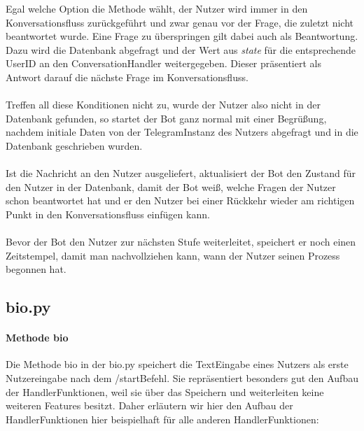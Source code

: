             Egal welche Option die Methode wählt, der Nutzer wird immer in den Konversationsfluss zurückgeführt und zwar genau vor der Frage, die zuletzt nicht beantwortet wurde. Eine Frage zu überspringen gilt dabei auch als Beantwortung. Dazu wird die Datenbank abgefragt und der Wert aus \emph{state} für die entsprechende User\-ID an den ConversationHandler weitergegeben. Dieser präsentiert als Antwort darauf die nächste Frage im Konversationsfluss. \\
            \\
            Treffen all diese Konditionen nicht zu, wurde der Nutzer also nicht in der Datenbank gefunden, so startet der Bot ganz normal mit einer Begrüßung, nachdem initiale Daten von der Telegram\-Instanz des Nutzers abgefragt und in die Datenbank geschrieben wurden. \\
            \\
            Ist die Nachricht an den Nutzer ausgeliefert, aktualisiert der Bot den Zustand für den Nutzer in der Datenbank, damit der Bot weiß, welche Fragen der Nutzer schon beantwortet hat und er den Nutzer bei einer Rückkehr wieder am richtigen Punkt in den Konversationsfluss einfügen kann.\\
            \\    
            Bevor der Bot den Nutzer zur nächsten Stufe weiterleitet, speichert er noch einen Zeitstempel, damit man nachvollziehen kann, wann der Nutzer seinen Prozess begonnen hat.


        \subsection{bio.py}
            \paragraph{Methode bio}
                Die Methode bio in der bio.py speichert die Text\-Eingabe eines Nutzers als erste Nutzereingabe nach dem /start\-Befehl. Sie repräsentiert besonders gut den Aufbau der Handler\-Funktionen, weil sie über das Speichern und weiterleiten keine weiteren Features besitzt. Daher erläutern wir hier den Aufbau der Handler\-Funktionen hier beispielhaft für alle anderen Handler\-Funktionen:

